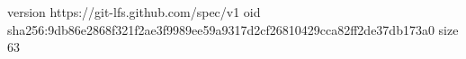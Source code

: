 version https://git-lfs.github.com/spec/v1
oid sha256:9db86e2868f321f2ae3f9989ee59a9317d2cf26810429cca82ff2de37db173a0
size 63
